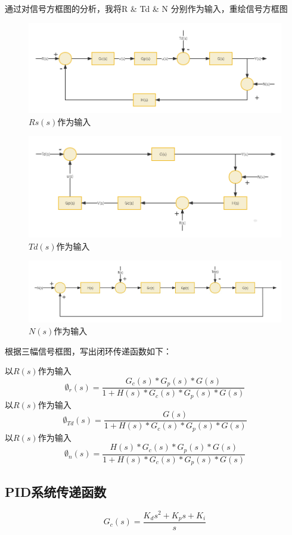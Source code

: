 \documentclass{thuemp}
\begin{document}
通过对信号方框图的分析，我将R & Td & N 分别作为输入，重绘信号方框图

\begin{figure}[H]
\centering
\includegraphics[width=0.8\linewidth]{./img/Rs.png}
\caption{$Rs(s)$作为输入} 
\end{figure}

\begin{figure}[H]
\centering
\includegraphics[width=0.8\linewidth]{./img/Td.png}
\caption{$Td(s)$作为输入} 
\end{figure}

\begin{figure}[H]
\centering
\includegraphics[width=0.8\linewidth]{./img/N.jpg}
\caption{$N(s)$作为输入} 
\end{figure}

根据三幅信号框图，写出闭环传递函数如下：

以$R(s)$作为输入
$$
\emptyset_r(s)=\frac{G_c(s)\ast G_p(s)\ast G(s)}{1+H(s)\ast G_c(s)\ast G_p(s)\ast G(s)}
$$
以$R(s)$作为输入
$$
\emptyset_{Td}\left(s\right)=\frac{G(s)}{1+H\left(s\right)\ast G_c\left(s\right)\ast G_p\left(s\right)\ast G\left(s\right)}
$$
以$R(s)$作为输入
$$
\emptyset_n(s)=\frac{H(s)\ast G_c(s)\ast G_p(s)\ast G(s)}{1+H(s)\ast G_c(s)\ast G_p(s)\ast G(s)}
$$

\subsection{PID系统传递函数}
$$
G_c\left(s\right)=\frac{K_ds^2+K_ps+K_i}{s}
$$
\end{document}
